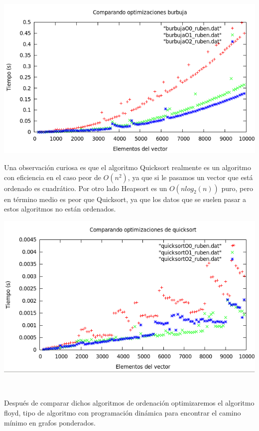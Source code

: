 \documentclass[11pt,spanish]{article} %
\begin{document}
\begin{center}
\includegraphics[scale=0.55]{../Graficas/Burbuja/burbuja_optimizacion.png}
\end{center}

Una observación curiosa es que el algoritmo Quicksort realmente es un algoritmo con eficiencia en el caso peor de $O(n^2)$, ya que si le pasamos un vector que está ordenado es cuadrático. Por otro lado Heapsort es un $O(nlog_2(n))$ puro, pero en término medio es peor que Quicksort, ya que los datos que se suelen pasar a estos algoritmos no están ordenados.

\begin{center}
\includegraphics[scale=0.55]{../Graficas/Quicksort/quicksort_optimizacion.png}
\end{center}

{\ }

Después de comparar dichos algoritmos de ordenación optimizaremos el algoritmo floyd, tipo de algoritmo con programación dinámica para encontrar el camino mínimo en grafos ponderados.
\end{document}
